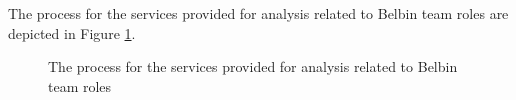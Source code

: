 The process for the services provided for analysis related to Belbin team roles are depicted in Figure \ref{fig:belbin_process}.

\begin{figure}[htb]
\begin{center}
\end{center}
\caption{ The process for the services provided for analysis related to Belbin team roles \label{fig:belbin_process}}
\end{figure}

